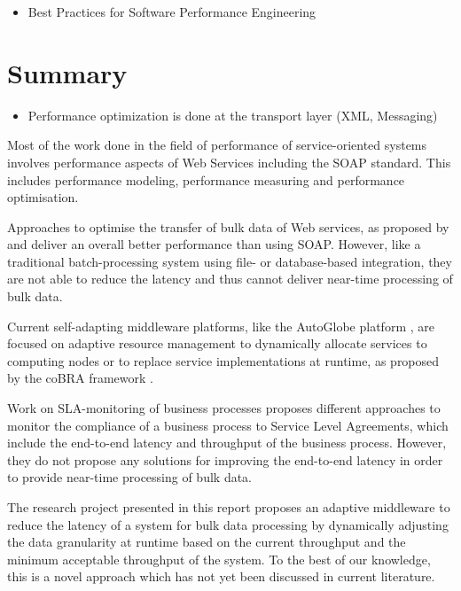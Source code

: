 \begin{itemize}
	\item Best Practices for Software Performance Engineering \citep{Smith:2003aa}
\end{itemize}

\section{Summary}

\begin{itemize}
  \item Performance optimization is done at the transport layer (XML, Messaging)
\end{itemize}

Most of the work done in the field of performance of service-oriented systems involves performance aspects of Web Services including the SOAP standard. This includes performance modeling, performance measuring and performance optimisation. 

Approaches to optimise the transfer of bulk data of Web services, as proposed by \citet{Wichaiwong:2007oq} and  \citet{Habich:2007ij} deliver an overall better performance than using SOAP. However, like a traditional batch-processing system using file- or database-based integration, they are not able to reduce the latency and thus cannot deliver near-time processing of bulk data.

Current self-adapting middleware platforms, like the AutoGlobe platform \citep{Gmach:2008vo}, are focused on adaptive resource management to dynamically allocate services to computing nodes or to replace service implementations at runtime, as proposed by the coBRA framework \citep{Irmert:2008nx}.

Work on SLA-monitoring of business processes proposes different approaches to monitor the compliance of a business process to Service Level Agreements, which include the end-to-end latency and throughput of the business process. However, they do not propose any solutions for improving the end-to-end latency in order to provide near-time processing of bulk data.

The research project presented in this report proposes an adaptive middleware to reduce the latency of a system for bulk data processing by dynamically adjusting the data granularity at runtime based on the current throughput and the minimum acceptable throughput of the system. To the best of our knowledge, this is a novel approach which has not yet been discussed in current literature.